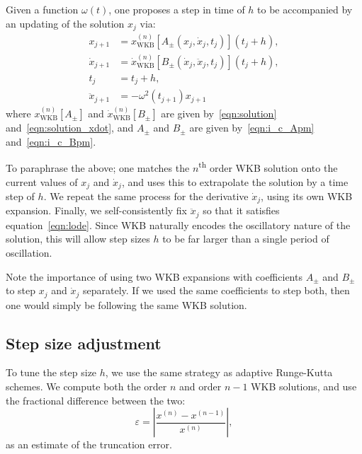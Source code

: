 Given a function \(\omega(t)\), one proposes a step in time of \(h\) to be accompanied by an updating of the solution \(x_j\) via:
\begin{align}
  x_{j+1} &= x_\mathrm{WKB}^{(n)}[A_\pm(x_j,\dot{x}_j,t_j)](t_j+h),
  \label{eqn:WKB_x_step} \\
  \dot{x}_{j+1} &= \dot{x}_\mathrm{WKB}^{(n)}[B_\pm(\dot{x}_j,\ddot{x}_j,t_j)](t_j+h),
  \label{eqn:WKB_xdot_step} \\
  t_j &= t_j+h,
  \label{eqn:WKB_t_step} \\
  \ddot{x}_{j+1} &= -\omega^2(t_{j+1})x_{j+1}
  \label{eqn:WKB_xddot} 
\end{align}
where \(x_\mathrm{WKB}^{(n)}[A_{\pm}]\) and \(\dot{x}_\mathrm{WKB}^{(n)}[B_{\pm}]\) are given by~\eqref{eqn:solution} and~\eqref{eqn:solution_xdot},  and \(A_{\pm}\) and \(B_{\pm}\)  are given by~\eqref{eqn:i_c_Apm} and~\eqref{eqn:i_c_Bpm}.

To paraphrase the above; one matches the \(n\)\textsuperscript{th} order WKB solution onto the current values of \(x_j\) and \(\dot{x}_j\), and uses this to extrapolate the solution by a time step of \(h\). We repeat the same process for the derivative \(\dot{x}_j\), using its own WKB expansion. Finally, we self-consistently fix \(\ddot{x}_j\) so that it satisfies equation~\eqref{eqn:lode}. Since WKB naturally encodes the oscillatory nature of the solution, this will allow step sizes \(h\) to be far larger than a single period of oscillation. 

Note the importance of using two WKB expansions with coefficients \(A_\pm\) and \(B_\pm\) to step \(x_j\) and \(\dot{x}_j\) separately. If we used the same coefficients to step both, then one would simply be following the same WKB solution.

\subsection{Step size adjustment}
To tune the step size \(h\), we use the same strategy as adaptive Runge-Kutta schemes. We compute both the order \(n\) and order \(n-1\) WKB solutions, and use the fractional difference between the two:
\begin{equation}
  \varepsilon = \left|\frac{x^{(n)}-x^{(n-1)}}{x^{(n)}}\right|,
  \nonumber
\end{equation}
as an estimate of the truncation error. 

